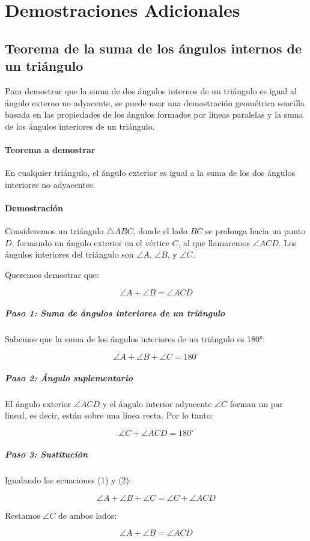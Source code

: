 \section*{Demostraciones Adicionales}

\subsection*{Teorema de la suma de los ángulos internos de un triángulo}
\label{sec:suma_angulos_internos}

Para demostrar que la suma de dos ángulos internos de un triángulo es igual al ángulo externo no adyacente, se puede usar una demostración geométrica sencilla basada en las propiedades de los ángulos formados por líneas paralelas y la suma de los ángulos interiores de un triángulo.

\paragraph{Teorema a demostrar}

En cualquier triángulo, el ángulo exterior es igual a la suma de los dos ángulos interiores no adyacentes.

\paragraph{Demostración}

Consideremos un triángulo \(\triangle ABC\), donde el lado \(BC\) se prolonga hacia un punto \(D\), formando un ángulo exterior en el vértice \(C\), al que llamaremos \(\angle ACD\). Los ángulos interiores del triángulo son \(\angle A\), \(\angle B\), y \(\angle C\).

Queremos demostrar que:

\[
\angle A + \angle B = \angle ACD
\]

\subparagraph{Paso 1: Suma de ángulos interiores de un triángulo}

Sabemos que la suma de los ángulos interiores de un triángulo es 180°:

\[
\angle A + \angle B + \angle C = 180^\circ
\]

\subparagraph{Paso 2: Ángulo suplementario}

El ángulo exterior \(\angle ACD\) y el ángulo interior adyacente \(\angle C\) forman un par lineal, es decir, están sobre una línea recta. Por lo tanto:

\[
\angle C + \angle ACD = 180^\circ
\]

\subparagraph{Paso 3: Sustitución}

Igualando las ecuaciones (1) y (2):

\[
\angle A + \angle B + \angle C = \angle C + \angle ACD
\]

Restamos \(\angle C\) de ambos lados:

\[
\angle A + \angle B = \angle ACD
\]

